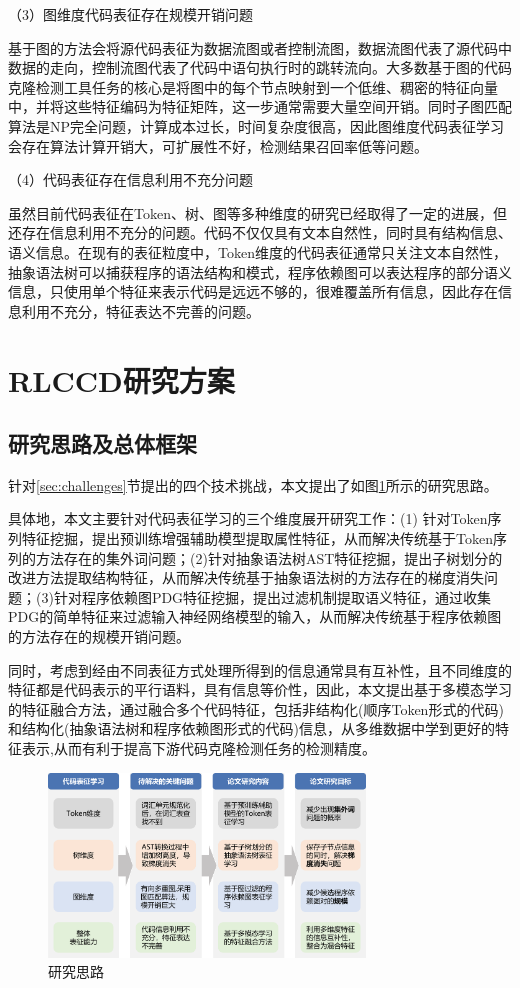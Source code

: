 （3）图维度代码表征存在规模开销问题

基于图的方法会将源代码表征为数据流图或者控制流图，数据流图代表了源代码中数据的走向，控制流图代表了代码中语句执行时的跳转流向。大多数基于图的代码克隆检测工具任务的核心是将图中的每个节点映射到一个低维、稠密的特征向量中，并将这些特征编码为特征矩阵，这一步通常需要大量空间开销。同时子图匹配算法是NP完全问题，计算成本过长，时间复杂度很高，因此图维度代码表征学习会存在算法计算开销大，可扩展性不好，检测结果召回率低等问题。

（4）代码表征存在信息利用不充分问题

虽然目前代码表征在Token、树、图等多种维度的研究已经取得了一定的进展，但还存在信息利用不充分的问题。代码不仅仅具有文本自然性，同时具有结构信息、语义信息。在现有的表征粒度中，Token维度的代码表征通常只关注文本自然性，抽象语法树可以捕获程序的语法结构和模式，程序依赖图可以表达程序的部分语义信息，只使用单个特征来表示代码是远远不够的，很难覆盖所有信息，因此存在信息利用不充分，特征表达不完善的问题。

\section{RLCCD研究方案}
\label{sec:Framework}

\subsection{研究思路及总体框架}
\label{subsec:Ideas}
针对\ref{sec:challenges}节提出的四个技术挑战，本文提出了如图\ref{fig:thinking}所示的研究思路。

具体地，本文主要针对代码表征学习的三个维度展开研究工作：(1) 针对Token序列特征挖掘，提出预训练增强辅助模型提取属性特征，从而解决传统基于Token序列的方法存在的集外词问题；(2)针对抽象语法树AST特征挖掘，提出子树划分的改进方法提取结构特征，从而解决传统基于抽象语法树的方法存在的梯度消失问题；(3)针对程序依赖图PDG特征挖掘，提出过滤机制提取语义特征，通过收集PDG的简单特征来过滤输入神经网络模型的输入，从而解决传统基于程序依赖图的方法存在的规模开销问题。

同时，考虑到经由不同表征方式处理所得到的信息通常具有互补性，且不同维度的特征都是代码表示的平行语料，具有信息等价性，因此，本文提出基于多模态学习的特征融合方法，通过融合多个代码特征，包括非结构化(顺序Token形式的代码)和结构化(抽象语法树和程序依赖图形式的代码)信息，从多维数据中学到更好的特征表示,从而有利于提高下游代码克隆检测任务的检测精度。

\begin{figure}[H]
    \centering
    \includegraphics[width=0.75\textwidth]{figures/thinking}
    \caption{研究思路}
    \label{fig:thinking}
\end{figure}

